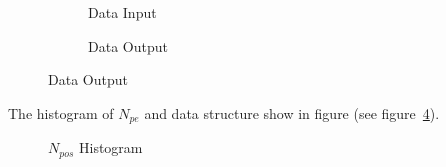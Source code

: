 \begin{figure}[H]
\begin{minipage}[b]{.5\textwidth}
\begin{figure}[H]
    \centering
    \resizebox{\textwidth}{!}{}
    \caption{\label{fig:input} Data Input}
\end{figure}
\end{minipage}
\begin{minipage}[b]{.5\textwidth}
\begin{figure}[H]
    \centering
    \resizebox{\textwidth}{!}{}
    \caption{\label{fig:output} Data Output}
\end{figure}
\end{minipage}
\end{figure}

The histogram of $N_{pe}$ and data structure show in figure (see figure~\ref{fig:penum}). 

\begin{figure}[H]
    \centering
    \scalebox{0.4}{}
    \caption{\label{fig:penum} $N_{pos}$ Histogram}
\end{figure}

